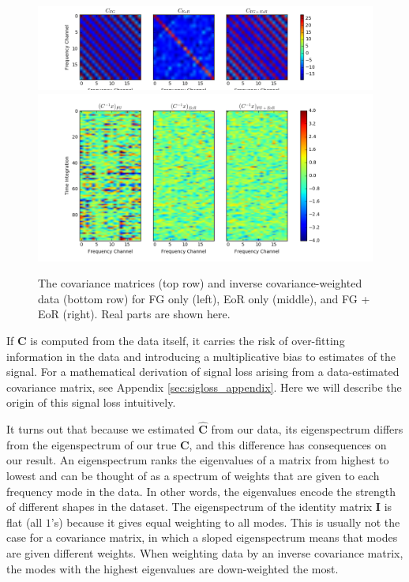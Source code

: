\documentclass[preprint2,numberedappendix,tighten]{aastex6}  %
\begin{document}
\begin{figure}
	\centering
	\includegraphics[trim={1.5cm 0.2cm 3.5cm 0.3cm},clip,width=\columnwidth]{plots/toy_sigloss12.png}
	\includegraphics[trim={1.5cm 0.2cm 3.5cm 0.3cm},clip,width=\columnwidth]{plots/toy_sigloss13.png}
	\caption{The covariance matrices (top row) and inverse covariance-weighted data (bottom row) for FG only (left), EoR only (middle), and FG + EoR (right). Real parts are shown here.}
	\label{fig:toy_sigloss12}
\end{figure}

If $\textbf{C}$ is computed from the data itself, it carries the risk of over-fitting information in the data and introducing a multiplicative bias to estimates of the signal. For a mathematical derivation of signal loss arising from a data-estimated covariance matrix, see Appendix \ref{sec:sigloss_appendix}. Here we will describe the origin of this signal loss intuitively.

It turns out that because we estimated $\hat{\textbf{C}}$ from our data, its eigenspectrum differs from the eigenspectrum of our true $\textbf{C}$, and this difference has consequences on our result. An eigenspectrum ranks the eigenvalues of a matrix from highest to lowest and can be thought of as a spectrum of weights that are given to each frequency mode in the data. In other words, the eigenvalues encode the strength of different shapes in the dataset. The eigenspectrum of the identity matrix $\textbf{I}$ is flat (all $1$'s) because it gives equal weighting to all modes. This is usually not the case for a covariance matrix, in which a sloped eigenspectrum means that modes are given different weights. When weighting data by an inverse covariance matrix, the modes with the highest eigenvalues are down-weighted the most. 
\end{document}

